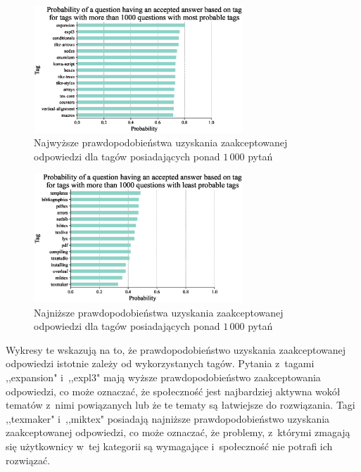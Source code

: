\documentclass[12pt]{article}
\begin{document}
	\begin{figure}[H]
		\centering
		\includegraphics[width=0.7\textwidth]{tags_top}
		\caption{Najwyższe prawdopodobieństwa uzyskania zaakceptowanej odpowiedzi dla tagów posiadających ponad $1\,000$ pytań}
		\label{fig:najwyzsze-prawdopodobienstwa-uzyskania-odpowiedzi-tagi}
	\end{figure}
	\begin{figure}[H]
		\centering
		\includegraphics[width=0.7\textwidth]{tags_bottom}
		\caption{Najniższe prawdopodobieństwa uzyskania zaakceptowanej odpowiedzi dla tagów posiadających ponad $1\,000$ pytań}
		\label{fig:najnizsze-prawdopodobienstwa-uzyskania-odpowiedzi-tagi}
	\end{figure}
	Wykresy te wskazują na to, że prawdopodobieństwo uzyskania zaakceptowanej odpowiedzi istotnie zależy od wykorzystanych tagów. Pytania z~tagami  ,,expansion" i~,,expl3" mają wyższe prawdopodobieństwo zaakceptowania odpowiedzi, co może oznaczać, że społeczność jest najbardziej aktywna wokół tematów z~nimi powiązanych lub że te tematy są łatwiejsze do rozwiązania. Tagi ,,texmaker" i~,,miktex" posiadają najniższe prawdopodobieństwo uzyskania zaakceptowanej odpowiedzi, co może oznaczać, że problemy, z~którymi zmagają się użytkownicy w~tej kategorii są wymagające i~społeczność nie potrafi ich rozwiązać.
	
\end{document}
